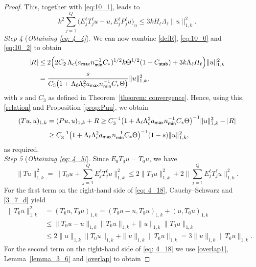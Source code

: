 \documentclass[numbers,webpdf,imaiai]{ima-authoring-template}%
\theoremstyle{thmstyletwo}%
\numberwithin{equation}{section}
\newcommand{\Cstar}{C_{\ast}}
\numberwithin{equation}{section}
\newcommand{\Cstab}{C_{\textup{\textsf{stab}}}}
\newcommand{\amax}{a_{\textup{\textsf{max}}}}
\newcommand{\nmin}{n_{\textup{\textsf{min}}}}
\begin{document}
{\begin{proof}
This, together with \eqref{eq:10_1}, leads to
\begin{equation}\label{eq:10_2}
	k^2 \sum_{j=1}^{Q} \bigl(E^{\ell}_j T^{\ell}_j u-u, E^{\ell}_j P^{\ell}_j u\bigr)_n 
	\le 3kH_{\ell} \Lambda_{\ell} \|u\|_{1,k}^2.
\end{equation}
\textit{Step 4} (\textit{Obtaining \eqref{eq: 4_4}}).
We can now combine \eqref{defR}, \eqref{eq:10_0} and \eqref{eq:10_2} to obtain
\begin{align*}
	|R| &\le 2 \Bigl(2 C_2\, \Lambda_c (\amax \nmin^{-1} \Cstar)^{1/2}
	k \Theta^{1/2} (1+\Cstab) + 3 k \Lambda_\ell H_\ell\Bigr) \|u\|_{1,k}^2
	\nonumber\\[0.5ex]
	&= \frac{s}{C_3 \bigl(1+\Lambda_\ell \Lambda_c^2 \amax \nmin^{-1} \Cstar \Theta \bigr)}	\|u\|_{1,k}^2, 
\end{align*}
with $s$ and $C_3$ as defined in Theorem~\ref{theorem: convergence}. 
Hence, using this, \eqref{relation} and Proposition \ref{prop:Puu}, we obtain
\begin{align*}
	(Tu,u)_{1,k} &= (Pu,u)_{1,k} + R 
	\ge C_3^{-1} \bigl(1 + \Lambda_\ell \Lambda_c^2 \amax \nmin^{-1} \Cstar \Theta \bigr)^{-1} \|u\|_{1,k}^2 - |R| 
	\nonumber\\[0.5ex]
	&\ge C_3^{-1} \bigl(1 + \Lambda_\ell \Lambda_c^2 \amax \nmin^{-1} \Cstar \Theta \bigr)^{-1} (1-s) \|u\|_{1,k}^2, 
\end{align*}
as required. 
\\[1ex]
\textit{Step 5} (\textit{Obtaining \eqref{eq: 4_5}}).
Since $E_0T_0 u = T_0u $, we have 
\begin{equation}\label{eq: 4_18}
	\|Tu\|_{1,k}^2 =  \Bigg\|T_0 u + \sum_{j=1}^{Q} E^{\ell}_j T^{\ell}_j u\Biggr\|_{1,k}^2 
	\le 2\|T_0 u\|_{1,k}^2 + 2\Bigg\| \sum_{j=1}^{Q} E^{\ell}_j T^{\ell}_j u\Bigg\|_{1,k}^2.
\end{equation}
For the first term on the right-hand side of \eqref{eq: 4_18},   Cauchy--Schwarz  and \eqref{3_7_d} yield
\begin{align}
	\|T_0 u\|_{1,k}^2 &= (T_0 u, T_0 u)_{1,k} 
	= (T_0 u - u, T_0 u)_{1,k} + (u, T_0 u)_{1,k} 
	\nonumber\\[0.5ex]
	&\le \|T_0 u - u\|_{1,k}\|T_0 u\|_{1,k} + \|u\|_{1,k}\|T_0 u\|_{1,k}
	\nonumber\\[0.5ex]
	&\le 2\|u\|_{1,k}\|T_0 u\|_{1,k} + \|u\|_{1,k}\|T_0 u\|_{1,k} 
	= 3\|u\|_{1,k}\|T_0 u\|_{1,k}. 
\label{eq: 4_19} 
\end{align}
For the second term on the right-hand side of \eqref{eq: 4_18} we use \eqref{overlap1}, Lemma~\ref{lemma_3_6} and \eqref{overlap} to obtain 

\end{proof}}
\end{document}
